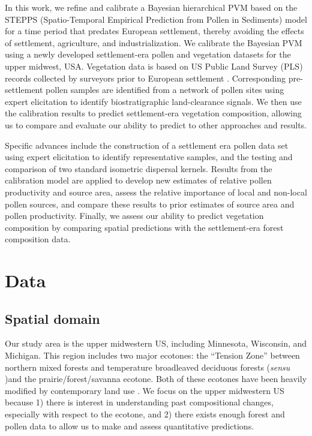 \documentclass[12pt]{article}
\begin{document}
In this work, we refine and calibrate a Bayesian hierarchical PVM
based on the STEPPS (Spatio-Temporal Empirical Prediction from Pollen
in Sediments) model \citep{paciorek2009mapping} for a time period that
predates European settlement, thereby avoiding the effects of
settlement, agriculture, and industrialization. We calibrate the
Bayesian PVM using a newly developed settlement-era pollen and
vegetation datasets for the upper midwest, USA. Vegetation data is
based on US Public Land Survey (PLS) records collected by surveyors
prior to European settlement \citep{bourdo1956review,
  schulte2001original, almendinger1996minnesota}. Corresponding
pre-settlement pollen samples are identified from a network of pollen
sites using expert elicitation to identify biostratigraphic
land-clearance signals. We then use the calibration results to predict
settlement-era vegetation composition, allowing us to compare and
evaluate our ability to predict to other approaches and results.

Specific advances include the construction of a settlement era pollen
data set using expert elicitation to identify representative samples,
and the testing and comparison of two standard isometric dispersal
kernels. Results from the calibration model are applied to develop new
estimates of relative pollen productivity and source area, assess the
relative importance of local and non-local pollen sources, and compare
these results to prior estimates of source area and pollen
productivity. Finally, we assess our ability to predict vegetation
composition by comparing spatial predictions with the settlement-era
forest composition data.

\section{Data}

\subsection{Spatial domain}

Our study area is the upper midwestern US, including Minnesota,
Wisconsin, and Michigan.  This region includes two major ecotones: the
``Tension Zone'' between northern mixed forests and temperature
broadleaved deciduous forests (\textit{sensu}
\citet{curtis1959vegetation})and the prairie/forest/savanna ecotone.
Both of these ecotones have been heavily modified by contemporary land
use \citep{goring_witness}. We focus on the upper midwestern US
because 1) there is interest in understanding past compositional
changes, especially with respect to the ecotone, and 2) there exists
enough forest and pollen data to allow us to make and assess
quantitative predictions.
\end{document}
